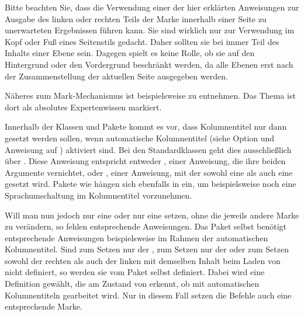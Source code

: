   Bitte beachten Sie, dass die Verwendung einer der hier
  erklärten Anweisungen zur Ausgabe des linken oder rechten Teils der Marke
  innerhalb einer Seite zu unerwarteten Ergebnissen führen kann. Sie sind
  wirklich nur zur Verwendung im Kopf oder Fuß eines Seitenstils
  gedacht. Daher sollten sie bei  immer Teil des Inhalts
  einer Ebene sein. Dagegen spielt es keine Rolle, ob sie auf den Hintergrund
  oder den Vordergrund beschränkt werden, da alle Ebenen erst nach der
  Zusammenstellung der aktuellen Seite ausgegeben werden.

  Näheres zum Mark-Mechanismus  ist beispielsweise
  \cite[Kapitel~23]{knuth:texbook} zu entnehmen. Das Thema ist dort als
  absolutes Expertenwissen markiert.%
  \EndIndexGroup


  \begin{Declaration}
  \end{Declaration}
  Innerhalb der Klassen und Pakete kommt es vor, dass Kolumnentitel nur dann
  gesetzt werden sollen, wenn automatische Kolumnentitel (siehe Option
   und Anweisung
   auf
  ) aktiviert sind. Bei
  den Standardklassen geht dies ausschließlich über . Diese
  Anweisung entspricht entweder , einer Anweisung, die ihre
  beiden Argumente vernichtet, oder ,
  einer Anweisung, mit der sowohl eine  als auch eine
   gesetzt wird. Pakete wie  hängen sich
  ebenfalls in  ein, um beispielsweise noch eine
  Sprachumschaltung im Kolumnentitel vorzunehmen.

  Will man nun jedoch nur eine  oder nur eine  setzen, ohne die jeweils andere Marke zu verändern, so fehlen
  entsprechende Anweisungen. Das Paket  selbst benötigt entsprechende Anweisungen beispielsweise im Rahmen der
  automatischen Kolumnentitel. Sind  zum Setzen nur der
  ,  zum Setzen nur der  oder  zum Setzen sowohl der rechten als auch der
  linken  mit demselben Inhalt beim Laden von
   nicht definiert, so werden sie vom Paket selbst definiert. Dabei wird eine
  Definition gewählt, die am Zustand von  erkennt, ob mit
  automatischen Kolumnentiteln gearbeitet wird. Nur in diesem Fall setzen die
  Befehle auch eine entsprechende Marke.%

